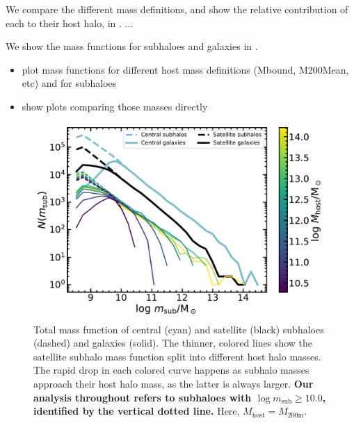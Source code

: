 \documentclass[usenatbib,fleqn]{mnras}
\newcommand{\comment}[1]{\textbf{\color{magenta} #1}}
\newcommand{\eagle}{EAGLE}
\newcommand{\msub}{m_\mathrm{sub}}
\newcommand{\Mhost}{M_\mathrm{host}}
\newcommand{\Msun}{\mathrm{M}_\odot}
\newcommand{\mtwo}{M_\mathrm{200m}}
\newcommand{\hMsun}{h^{-1}\,\Msun}
\begin{document}
We compare the different mass definitions, and show the relative contribution of each to their host halo, in .  ...

We show the mass functions for subhaloes and galaxies in .

\begin{itemize}
  \item plot mass functions for different host mass definitions (Mbound, M200Mean, etc) and for subhaloes
  \item show plots comparing those masses directly
\end{itemize}

\begin{figure}
  \centerline{\includegraphics[width=\linewidth]{nmsub.pdf}}
  \caption{Total mass function of central (cyan) and satellite (black) subhaloes (dashed) and galaxies (solid). The thinner, colored lines show the satellite subhalo mass function split into different host halo masses. The rapid drop in each colored curve happens as subhalo masses approach their host halo mass, as the latter is always larger. \comment{Our analysis throughout refers to subhaloes with $\log\msub\geq10.0$, identified by the vertical dotted line.} Here, $\Mhost=\mtwo$.}
  \label{f:massfunction}
\end{figure}


\end{document}
